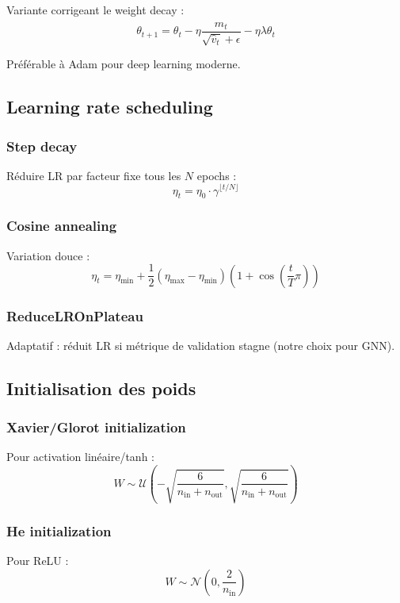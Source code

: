 Variante corrigeant le weight decay :
\[
\theta_{t+1} = \theta_t - \eta \frac{\hat{m}_t}{\sqrt{\hat{v}_t} + \epsilon} - \eta \lambda \theta_t
\]

Préférable à Adam pour deep learning moderne.

\subsection{Learning rate scheduling}

\subsubsection{Step decay}

Réduire LR par facteur fixe tous les $N$ epochs :
\[
\eta_t = \eta_0 \cdot \gamma^{\lfloor t/N \rfloor}
\]

\subsubsection{Cosine annealing}

Variation douce :
\[
\eta_t = \eta_{\min} + \frac{1}{2}(\eta_{\max} - \eta_{\min})\left(1 + \cos\left(\frac{t}{T}\pi\right)\right)
\]

\subsubsection{ReduceLROnPlateau}

Adaptatif : réduit LR si métrique de validation stagne (notre choix pour GNN).

\subsection{Initialisation des poids}

\subsubsection{Xavier/Glorot initialization}

Pour activation linéaire/tanh :
\[
W \sim \mathcal{U}\left(-\sqrt{\frac{6}{n_{\text{in}} + n_{\text{out}}}}, \sqrt{\frac{6}{n_{\text{in}} + n_{\text{out}}}}\right)
\]

\subsubsection{He initialization}

Pour ReLU :
\[
W \sim \mathcal{N}\left(0, \frac{2}{n_{\text{in}}}\right)
\]

